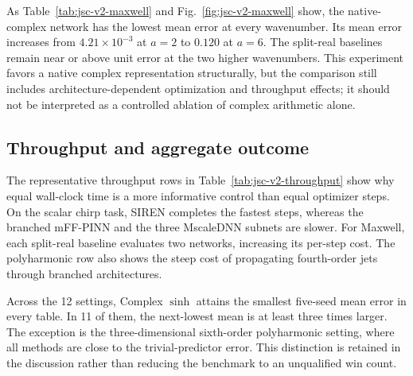 As Table~\ref{tab:jsc-v2-maxwell} and Fig.~\ref{fig:jsc-v2-maxwell} show, the
native-complex network has the lowest mean error at every wavenumber. Its
mean error increases from \(4.21\times10^{-3}\) at \(a=2\) to \(0.120\) at
\(a=6\). The split-real baselines remain near or above unit error at the two
higher wavenumbers. This experiment favors a native complex representation
structurally, but the comparison still includes architecture-dependent
optimization and throughput effects; it should not be interpreted as a
controlled ablation of complex arithmetic alone.

\subsection{Throughput and aggregate outcome}



The representative throughput rows in Table~\ref{tab:jsc-v2-throughput} show
why equal wall-clock time is a more
informative control than equal optimizer steps. On the scalar chirp task,
SIREN completes the fastest steps, whereas the branched mFF-PINN and the three
MscaleDNN subnets are slower. For Maxwell, each split-real baseline evaluates
two networks, increasing its per-step cost. The polyharmonic row also shows
the steep cost of propagating fourth-order jets through branched architectures.

Across the 12 settings, Complex \(\sinh\) attains the smallest
five-seed mean error in every table. In 11 of them, the next-lowest mean is
at least three times larger. The exception is the three-dimensional
sixth-order polyharmonic setting, where all methods are close to the
trivial-predictor error. This distinction is retained in the discussion rather
than reducing the benchmark to an unqualified win count.
